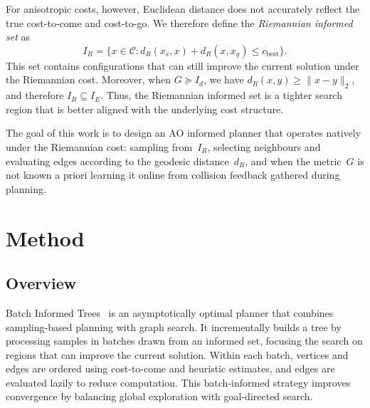 \documentclass[journal]{IEEEtran}
\newcommand{\Cspace}{\mathcal{C}}
\newcommand{\IR}{I_{\!R}}
\newcommand{\IE}{I_{\!E}}
\newcommand{\dR}{d_{\!R}}
\begin{document}
For anisotropic costs, however, Euclidean distance does not accurately
reflect the true cost-to-come and cost-to-go. We therefore define the
\emph{Riemannian informed set} as
\begin{equation}\label{eq:IR}
  \IR = \bigl\{ x \in \Cspace : \dR(x_s, x) + \dR(x, x_g) \le c_{\mathrm{best}} \bigr\}.
\end{equation}
This set contains configurations that can still improve the current
solution under the Riemannian cost. Moreover, when $G \succeq I_d$, we
have $\dR(x,y) \ge \|x-y\|_2$, and therefore $\IR \subseteq \IE$. Thus,
the Riemannian informed set is a tighter search region that is better
aligned with the underlying cost structure.

The goal of this work is to design an AO informed planner that operates natively under the Riemannian cost: sampling from~$\IR$, selecting neighbours and evaluating edges according to the geodesic distance~$\dR$, and when the metric~$G$ is not known a priori learning it online from collision feedback gathered during planning.


\section{Method}\label{sec:method}
\subsection{Overview}\label{sec:overview}


Batch Informed Trees~\cite{Gammell2020} is an asymptotically
optimal planner that combines sampling-based planning with graph search.
It incrementally builds a tree by processing samples in batches drawn
from an informed set, focusing the search on regions that can improve
the current solution. Within each batch, vertices and edges are ordered
using cost-to-come and heuristic estimates, and edges are evaluated
lazily to reduce computation. This batch-informed strategy improves
convergence by balancing global exploration with goal-directed search.
\end{document}
